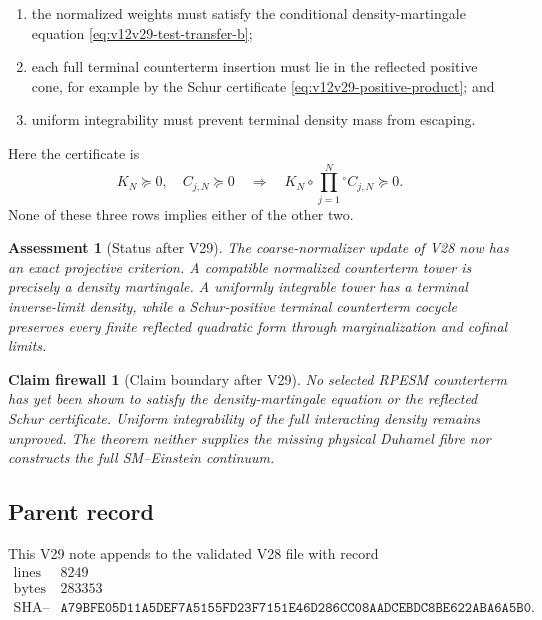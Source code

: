 \documentclass[11pt]{article}
\newtheorem{firewall}[theorem]{Claim firewall}
\newtheorem{assessment}[theorem]{Assessment}
\theoremstyle{remark}
\begin{document}
\begin{enumerate}
\item the normalized weights must satisfy the conditional
density-martingale equation \eqref{eq:v12v29-test-transfer-b};
\item each full terminal counterterm insertion must lie in the
reflected positive cone, for example by the Schur certificate
\eqref{eq:v12v29-positive-product}; and
\item uniform integrability must prevent terminal density mass from
escaping.
\end{enumerate}
Here the certificate is
\begin{equation}
 K_N\succeq0,\quad C_{j,N}\succeq0
 \quad\Longrightarrow\quad
 K_N\circ\prod_{j=1}^N{}^{\circ}C_{j,N}\succeq0.
                                                        \tag{29.22}
 \label{eq:v12v29-positive-product}
\end{equation}
None of these three rows implies either of the other two.

\begin{assessment}[Status after V29]
\label{ass:v12v29-status}
The coarse-normalizer update of V28 now has an exact projective
criterion.  A compatible normalized counterterm tower is precisely a
density martingale.  A uniformly integrable tower has a terminal
inverse-limit density, while a Schur-positive terminal counterterm
cocycle preserves every finite reflected quadratic form through
marginalization and cofinal limits.
\end{assessment}

\begin{firewall}[Claim boundary after V29]
\label{fire:v12v29-claim}
No selected RPESM counterterm has yet been shown to satisfy the
density-martingale equation or the reflected Schur certificate.
Uniform integrability of the full interacting density remains
unproved.  The theorem neither supplies the missing physical Duhamel
fibre nor constructs the full SM--Einstein continuum.
\end{firewall}

\subsection{Parent record}

This V29 note appends to the validated V28 file with record
\[
\begin{array}{c|c}
\text{lines}&8249\\
\text{bytes}&283353\\
\text{SHA--256}&
\texttt{A79BFE05D11A5DEF7A5155FD23F7151E46D286CC08AADCEBDC8BE622ABA6A5B0}.
\end{array}
\]
\end{document}
